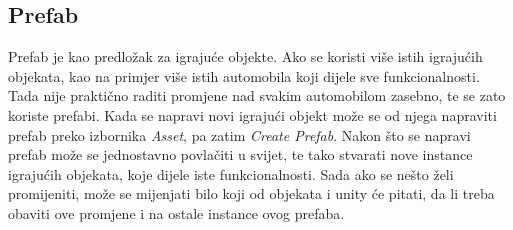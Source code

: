 \subsection{Prefab}
Prefab je kao predložak za igrajuće objekte. Ako se koristi više istih igrajućih objekata, kao na primjer više istih automobila koji dijele sve funkcionalnosti. Tada nije praktično raditi promjene nad svakim automobilom zasebno, te se zato koriste prefabi. Kada se napravi novi igrajući objekt može se od njega napraviti prefab preko izbornika \emph{Asset}, pa zatim \emph{Create Prefab}. Nakon što se napravi prefab može se jednostavno povlačiti u svijet, te tako stvarati nove instance igrajućih objekata, koje dijele iste funkcionalnosti. Sada ako se nešto želi promijeniti, može se mijenjati bilo koji od objekata i unity će pitati, da li treba obaviti ove promjene i na ostale instance ovog prefaba.